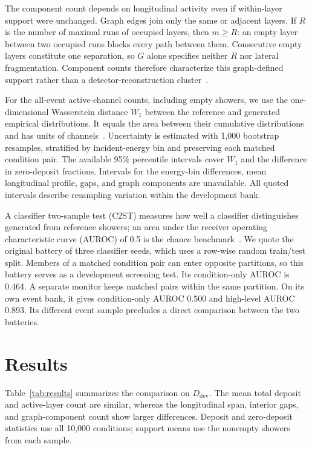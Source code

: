 \documentclass[11pt]{article}
\newcommand{\Ddev}{D_{\mathrm{dev}}}
\begin{document}
The component count depends on longitudinal activity even if within-layer support were unchanged. Graph edges join only the same or adjacent layers. If $R$ is the number of maximal runs of occupied layers, then $m\geq R$: an empty layer between two occupied runs blocks every path between them. Consecutive empty layers constitute one separation, so $G$ alone specifies neither $R$ nor lateral fragmentation. Component counts therefore characterize this graph-defined support rather than a detector-reconstruction cluster~\cite{atlastopocluster}.

For the all-event active-channel counts, including empty showers, we use the one-dimensional Wasserstein distance $W_1$ between the reference and generated empirical distributions. It equals the area between their cumulative distributions and has units of channels~\cite{kansalmetrics}. Uncertainty is estimated with 1,000 bootstrap resamples, stratified by incident-energy bin and preserving each matched condition pair. The available 95\% percentile intervals cover $W_1$ and the difference in zero-deposit fractions. Intervals for the energy-bin differences, mean longitudinal profile, gaps, and graph components are unavailable. All quoted intervals describe resampling variation within the development bank.

A classifier two-sample test (C2ST) measures how well a classifier distinguishes generated from reference showers; an area under the receiver operating characteristic curve (AUROC) of 0.5 is the chance benchmark~\cite{c2st,kansalmetrics}. We quote the original battery of three classifier seeds, which uses a row-wise random train/test split. Members of a matched condition pair can enter opposite partitions, so this battery serves as a development screening test. Its condition-only AUROC is 0.464. A separate monitor keeps matched pairs within the same partition. On its own event bank, it gives condition-only AUROC 0.500 and high-level AUROC 0.893. Its different event sample precludes a direct comparison between the two batteries.

\section{Results}
\label{sec:results}

Table~\ref{tab:results} summarizes the comparison on $\Ddev$. The mean total deposit and active-layer count are similar, whereas the longitudinal span, interior gaps, and graph-component count show larger differences. Deposit and zero-deposit statistics use all 10,000 conditions; support means use the nonempty showers from each sample.
\end{document}
